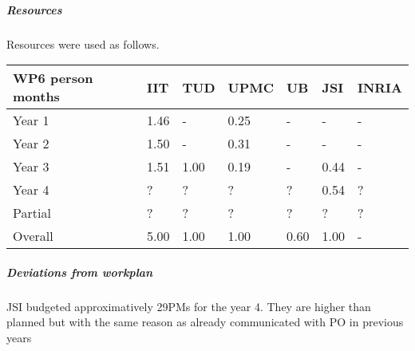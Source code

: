 

\subparagraph*{Resources}

Resources were used as follows.

\begin{center}
\begin{tabular}{|C{1.5cm}|C{1.5cm}|C{1.5cm}|C{2cm}|C{2cm}|C{2cm}|C{2cm}|}
\hline
\footnotesize \textbf{WP6 person months}& \footnotesize \textbf{IIT}&\footnotesize \textbf{TUD}&\footnotesize \textbf{UPMC}& \footnotesize \textbf{UB} &\footnotesize \textbf{JSI} & \footnotesize \textbf{INRIA} \\ \hline
\footnotesize Year 1 &  1.46 & - & 0.25 & - & - & -    \\  \hline
\footnotesize Year 2 &  1.50 & - & 0.31 & - & - & -     \\  \hline
\footnotesize Year 3 &  1.51 & 1.00 & 0.19 & - & 0.44 & - \\ \hline
\footnotesize Year 4  & ?     & ?    & ?    & ?    & 0.54    & ?    \\   	\hline
\footnotesize Partial & ?     & ?    & ?    & ?    & ?    & ?    \\
\hline \hline
\footnotesize Overall &  5.00 & 1.00 & 1.00 & 0.60 & 1.00 & - \\ \hline
\end{tabular}
\end{center}

\subparagraph*{Deviations from workplan} 
JSI budgeted approximatively 29PMs for the year 4. They are higher than planned but with the same reason as already communicated with PO in previous years 
